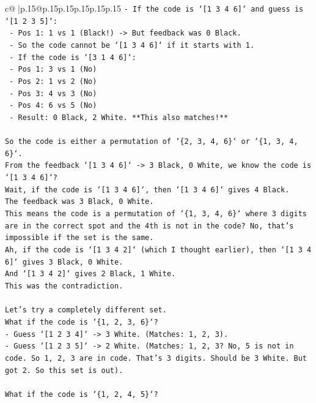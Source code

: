 \documentclass{article}
\begin{document}
{\begin{supertabular}{c@{$\;$}|p{.15\linewidth}@{}p{.15\linewidth}p{.15\linewidth}p{.15\linewidth}p{.15\linewidth}p{.15\linewidth}}
{{{\texttt{{-} If the code is `{[}1 3 4 6{]}` and guess is `{[}1 2 3 5{]}`:} \\
\texttt{  {-} Pos 1: 1 vs 1 (Black!) {-}> But feedback was 0 Black.} \\
\texttt{  {-} So the code cannot be `{[}1 3 4 6{]}` if it starts with 1.} \\
\texttt{  {-} If the code is `{[}3 1 4 6{]}`:} \\
\texttt{    {-} Pos 1: 3 vs 1 (No)} \\
\texttt{    {-} Pos 2: 1 vs 2 (No)} \\
\texttt{    {-} Pos 3: 4 vs 3 (No)} \\
\texttt{    {-} Pos 4: 6 vs 5 (No)} \\
\texttt{    {-} Result: 0 Black, 2 White. **This also matches!**} \\
\\ 
\texttt{So the code is either a permutation of `\{2, 3, 4, 6\}` or `\{1, 3, 4, 6\}`.} \\
\texttt{From the feedback `{[}1 3 4 6{]}` {-}> 3 Black, 0 White, we know the code is `{[}1 3 4 6{]}`?} \\
\texttt{Wait, if the code is `{[}1 3 4 6{]}`, then `{[}1 3 4 6{]}` gives 4 Black.} \\
\texttt{The feedback was 3 Black, 0 White.} \\
\texttt{This means the code is a permutation of `\{1, 3, 4, 6\}` where 3 digits are in the correct spot and the 4th is not in the code? No, that's impossible if the set is the same.} \\
\texttt{Ah, if the code is `{[}1 3 4 2{]}` (which I thought earlier), then `{[}1 3 4 6{]}` gives 3 Black, 0 White.} \\
\texttt{And `{[}1 3 4 2{]}` gives 2 Black, 1 White.} \\
\texttt{This was the contradiction.} \\
\\ 
\texttt{Let's try a completely different set.} \\
\texttt{What if the code is `\{1, 2, 3, 6\}`?} \\
\texttt{{-} Guess `{[}1 2 3 4{]}` {-}> 3 White. (Matches: 1, 2, 3).} \\
\texttt{{-} Guess `{[}1 2 3 5{]}` {-}> 2 White. (Matches: 1, 2, 3? No, 5 is not in code. So 1, 2, 3 are in code. That's 3 digits. Should be 3 White. But got 2. So this set is out).} \\
\\ 
\texttt{What if the code is `\{1, 2, 4, 5\}`?} \\
}}}
\end{supertabular}}
\end{document}

